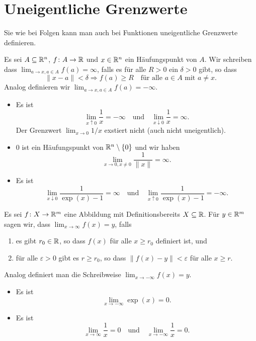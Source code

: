 \documentclass[a4paper,10pt]{article}
\begin{document}
\section{Uneigentliche Grenzwerte}
Sie wie bei Folgen kann man auch bei Funktionen uneigentliche Grenzwerte definieren.


\begin{defi}
 Es sei $A \subseteq \mathbb{R}^n$, $f \colon A \to \mathbb{R}$ und $x \in \mathbb{R}^n$ ein Häufungspunkt von $A$. Wir schreiben dass $\lim_{a \to x, a \in A} f(a) = \infty$, falls es für alle $R > 0$ ein $\delta > 0$ gibt, so dass
 \[
  \|x-a\| < \delta \Rightarrow f(a) \geq R \quad \text{für alle $a \in A$ mit $a \neq x$}.
 \]
 Analog definieren wir $\lim_{a \to x, a \in A} f(a) = -\infty.$
\end{defi}


\begin{bsp}
 \begin{itemize}
  \item
   Es ist
   \[
    \lim_{x \uparrow 0} \frac{1}{x} = -\infty
    \quad
    \text{und}
    \quad
    \lim_{x \downarrow 0} \frac{1}{x} = \infty.
   \]
   Der Grenzwert $\lim_{x \to 0} 1/x$ exstiert nicht (auch nicht uneigentlich).
  \item
   $0$ ist ein Häufungspunkt von $\mathbb{R}^n \setminus \{0\}$ und wir haben
   \[
    \lim_{x \to 0, x \neq 0} \frac{1}{\|x\|} = \infty.
   \]
  \item
   Es ist
   \[
    \lim_{x \downarrow 0} \frac{1}{\exp(x) - 1} = \infty
    \quad
    \text{und}
    \quad
    \lim_{x \uparrow 0} \frac{1}{\exp(x) - 1} = -\infty.
   \]
 \end{itemize}
\end{bsp}


\begin{defi}
 Es sei $f \colon X \to \mathbb{R}^m$ eine Abbildung mit Definitionsbereits $X \subseteq \mathbb{R}$. Für $y \in \mathbb{R}^m$ sagen wir, dass $\lim_{x \to \infty} f(x) = y$, falls
 \begin{enumerate}
  \item
   es gibt $r_0 \in \mathbb{R}$, so dass $f(x)$ für alle $x \geq r_0$ definiert ist, und
  \item
   für alle $\varepsilon > 0$ gibt es $r \geq r_0$, so dass $\|f(x) - y\| < \varepsilon$ für alle $x \geq r$.
 \end{enumerate}
 Analog definiert man die Schreibweise $\lim_{x \to -\infty} f(x) = y$.
\end{defi}


\begin{bsp}
 \begin{itemize}
  \item
   Es ist
   \[
    \lim_{x \to -\infty} \exp(x) = 0.
   \]
  \item
   Es ist
   \[
    \lim_{x \to \infty} \frac{1}{x} = 0
    \quad
    \text{und}
    \quad
    \lim_{x \to -\infty} \frac{1}{x} = 0.
   \]
 \end{itemize}
\end{bsp}
\end{document}
